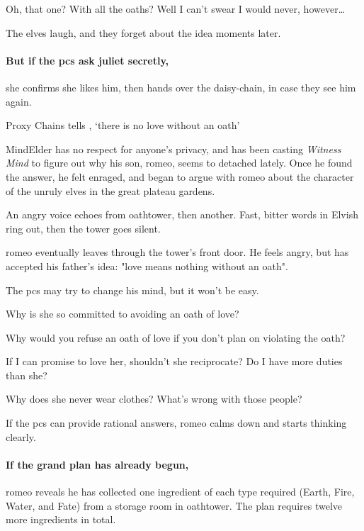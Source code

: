 \begin{speechtext}
  Oh, that one?
  With all the oaths?
  Well I can't swear I would never, however\ldots
\end{speechtext}

The elves laugh, and they forget about the idea moments later.

\paragraph{But if the \glspl{pc} ask \gls{juliet} secretly,}
she confirms she likes him, then hands over the daisy-chain, in case they see him again.

{Proxy Chains}%
{ tells , `there is no love without an oath'}%

\Gls{MindElder} has no respect for anyone's privacy, and has been \gls{casting} \textit{Witness Mind} to figure out why his son, \gls{romeo}, seems to detached lately.
Once he found the answer, he felt enraged, and began to argue with \gls{romeo} about the character of the unruly elves in the great plateau gardens.


\begin{boxtext}
  An angry voice echoes from \gls{oathtower}, then another.
  Fast, bitter words in Elvish ring out, then the tower goes silent.
\end{boxtext}

\Gls{romeo} eventually leaves through the tower's front door.
He feels angry, but has accepted his father's idea: "love means nothing without an oath".

The \glspl{pc} may try to change his mind, but it won't be easy.

\begin{speechtext}
  Why is she so committed to avoiding an oath of love?

  Why would you refuse an oath of love if you don't plan on violating the oath?

  If I can promise to love her, shouldn't she reciprocate?
  Do I have more duties than she?

  Why does she never wear clothes?
  What's wrong with those people?
\end{speechtext}

If the \glspl{pc} can provide rational answers, \gls{romeo} calms down and starts thinking clearly.

\paragraph{If the grand plan has already begun,}
\Gls{romeo} reveals he has collected one \gls{ingredient} of each type required (Earth, Fire, Water, and Fate) from a storage room in \gls{oathtower}.
The plan requires twelve more \glspl{ingredient} in total.

